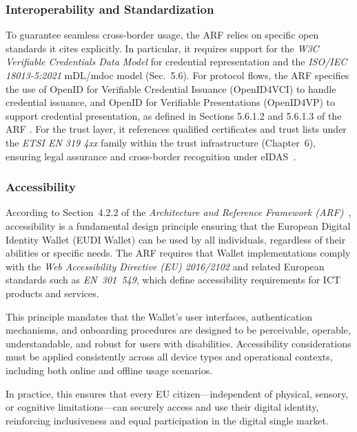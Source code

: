 \documentclass[sigconf,balance,nonacm,authordraft]{acmart}
\begin{document}
\subsubsection*{Interoperability and Standardization}
To guarantee seamless cross-border usage, the ARF relies on specific open standards it cites explicitly. In particular, it requires support for the \emph{W3C Verifiable Credentials Data Model} for credential representation and the \emph{ISO/IEC 18013-5:2021} mDL/mdoc model (Sec.~5.6). For protocol flows, the ARF specifies the use of OpenID for Verifiable Credential Issuance (OpenID4VCI) to handle credential issuance, and OpenID for Verifiable Presentations (OpenID4VP) to support credential presentation, as defined in Sections 5.6.1.2 and 5.6.1.3 of the ARF
. For the trust layer, it references qualified certificates and trust lists under the \emph{ETSI EN 319 4xx} family within the trust infrastructure (Chapter~6), ensuring legal assurance and cross-border recognition under eIDAS~\cite{EU_ARF2024,EU_eIDAS2024}.

\subsubsection*{Accessibility}

According to Section~4.2.2 of the \textit{Architecture and Reference Framework (ARF)}~\cite{EU_ARF2024}, accessibility is a fundamental design principle ensuring that the European Digital Identity Wallet (EUDI Wallet) can be used by all individuals, regardless of their abilities or specific needs. The ARF requires that Wallet implementations comply with the \textit{Web Accessibility Directive (EU) 2016/2102} and related European standards such as \textit{EN~301~549}, which define accessibility requirements for ICT products and services.

This principle mandates that the Wallet’s user interfaces, authentication mechanisms, and onboarding procedures are designed to be perceivable, operable, understandable, and robust for users with disabilities. Accessibility considerations must be applied consistently across all device types and operational contexts, including both online and offline usage scenarios.

In practice, this ensures that every EU citizen—independent of physical, sensory, or cognitive limitations—can securely access and use their digital identity, reinforcing inclusiveness and equal participation in the digital single market.
\end{document}
